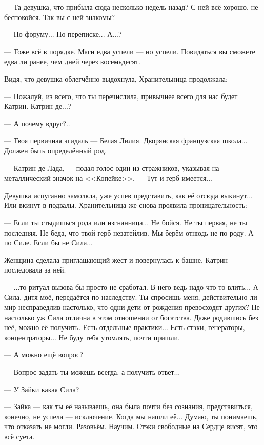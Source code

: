 --- Та девушка, что прибыла сюда несколько недель назад? С ней всё хорошо, не беспокойся. Так вы с ней знакомы?

--- По форуму... По переписке... А...?

--- Тоже всё в порядке. Маги едва успели --- но успели. Повидаться вы сможете едва ли ранее, чем дней через восемьдесят.

\emptypar

Видя, что девушка облегчённо выдохнула, Хранительница продолжала:

--- Пожалуй, из всего, что ты перечислила, привычнее всего для нас будет Катрин. Катрин де...?

--- А почему вдруг?..

--- Твоя первичная эгидаль --- Белая Лилия. Дворянская французская школа... Должен быть определённый род.

--- Катрин де Лада, --- подал голос один из стражников, указывая на металлический значок на <<Копейке>>.
--- Тут и герб имеется...

Девушка испуганно замолкла, уже успев представить, как её отсюда выкинут... Или вкинут в подвалы.
Хранительница же снова проявила проницательность:

--- Если ты стыдишься рода или изгнанница... Не бойся. Не ты первая, не ты последняя.
Не беда, что твой герб незатейлив.
Мы берём отнюдь не по роду.
А по Силе. Если бы не Сила...

Женщина сделала приглашающий жест и повернулась к башне, Катрин последовала за ней.

--- ...то ритуал вызова бы просто не сработал. В него ведь надо что-то влить...
А Сила, дитя моё, передаётся по наследству.
Ты спросишь меня, действительно ли мир несправедлив настолько, что одни дети от рождения превосходят других?
Не настолько уж Сила отлична в этом отношении от богатства. Даже родившись без неё, можно её получить.
Есть отдельные практики... Есть стэки, генераторы, концентраторы... Не буду тебя утомлять, почти пришли.

--- А можно ещё вопрос?

--- Вопрос задать ты можешь всегда, а получить ответ...

--- У Зайки какая Сила?

--- Зайка --- как ты её называешь, она была почти без сознания, представиться, конечно, не успела --- исключение.
Когда мы нашли её... Думаю, ты понимаешь, что отказать не могли. Разовьём.
Научим. Стэки свободные на Сердце висят, это всё суета.

